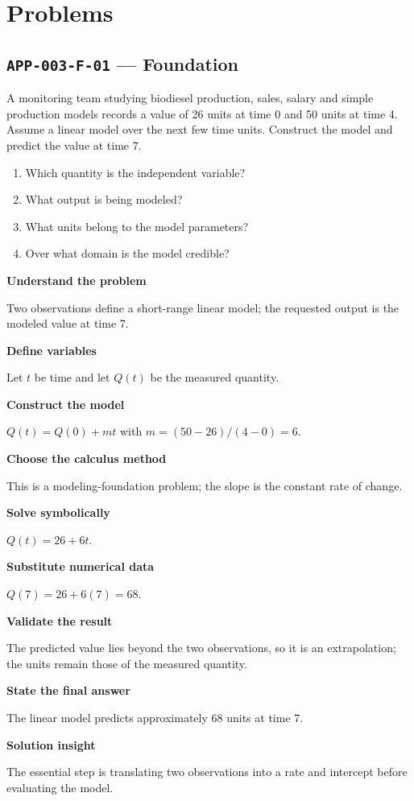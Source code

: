 \documentclass[11pt]{book}
\newcommand{\pid}[1]{\texttt{#1}}
\begin{document}
\section*{Problems}
\subsection*{\pid{APP-003-F-01} — Foundation}
\begin{problembox}
A monitoring team studying biodiesel production, sales, salary and simple production models records a value of 26 units at time 0 and 50 units at time 4. Assume a linear model over the next few time units. Construct the model and predict the value at time 7.
\end{problembox}
\begin{promptbox}\begin{enumerate}
\item Which quantity is the independent variable?
\item What output is being modeled?
\item What units belong to the model parameters?
\item Over what domain is the model credible?
\end{enumerate}\end{promptbox}
\begin{solutionbox}
\textbf{Understand the problem}\par Two observations define a short-range linear model; the requested output is the modeled value at time 7.\par\medskip
\textbf{Define variables}\par Let $t$ be time and let $Q(t)$ be the measured quantity.\par\medskip
\textbf{Construct the model}\par $Q(t)=Q(0)+mt$ with $m=(50-26)/(4-0)=6$.\par\medskip
\textbf{Choose the calculus method}\par This is a modeling-foundation problem; the slope is the constant rate of change.\par\medskip
\textbf{Solve symbolically}\par $Q(t)=26+6t$.\par\medskip
\textbf{Substitute numerical data}\par $Q(7)=26+6(7)=68$.\par\medskip
\textbf{Validate the result}\par The predicted value lies beyond the two observations, so it is an extrapolation; the units remain those of the measured quantity.\par\medskip
\textbf{State the final answer}\par The linear model predicts approximately $68$ units at time 7.\par\medskip
\textbf{Solution insight}\par The essential step is translating two observations into a rate and intercept before evaluating the model.\par\medskip
\end{solutionbox}
\end{document}
